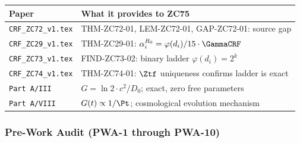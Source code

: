 \documentclass[12pt, a4paper]{article}
\begin{document}
\begin{keybox}[title={Companion Papers --- ZC75}]
{\small\renewcommand{\arraystretch}{1.25}
\begin{center}
\begin{tabular}{@{}p{5.0cm}p{7.5cm}@{}}
\toprule
\textbf{Paper} & \textbf{What it provides to ZC75} \\
\midrule
\texttt{CRF\_ZC72\_v1.tex}
  & THM-ZC72-01, LEM-ZC72-01, GAP-ZC72-01: source gap \\
\texttt{CRF\_ZC29\_v1.tex}
  & THM-ZC29-01: $\alpha_i^{R_0} = \varphi(d_i)/15 \cdot \GammaCRF$ \\
\texttt{CRF\_ZC73\_v1.tex}
  & FIND-ZC73-02: binary ladder $\varphi(d_i) = 2^k$ \\
\texttt{CRF\_ZC74\_v1.tex}
  & THM-ZC74-01: $\Ztf$ uniqueness confirms ladder is exact \\
\texttt{Part~A/III}
  & $G = \ln2 \cdot c^2/D_0$; exact, zero free parameters \\
\texttt{Part~A/VIII}
  & $G(t) \propto 1/\Pt$; cosmological evolution mechanism \\
\bottomrule
\end{tabular}
\end{center}}
\end{keybox}

\subsubsection{Pre-Work Audit (PWA-1 through PWA-10)}
\end{document}
